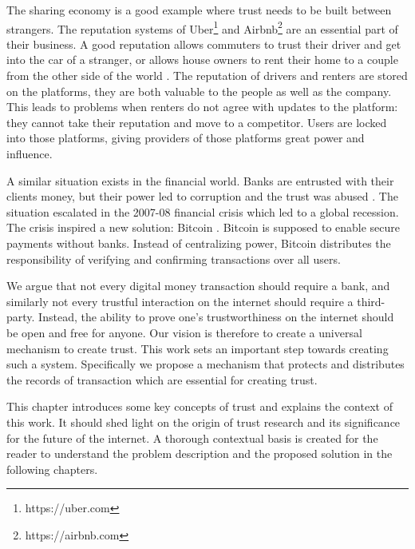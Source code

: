 The sharing economy is a good example where trust needs to be built between strangers.
The reputation systems of Uber\footnote{https://uber.com} and Airbnb\footnote{https://airbnb.com} are
an essential part of their business. A good reputation allows commuters to trust their driver and
get into the car of a stranger, or allows house owners to rent their home to a couple from the other
side of the world \cite{ert2016trust}. The reputation of drivers and renters are stored on the platforms, they are both
valuable to the people as well as the company. This leads to problems when renters do not agree with
updates to the platform: they cannot take their reputation and move to a competitor. Users are locked
into those platforms, giving providers of those platforms great power and influence.

A similar situation exists in the financial world. Banks are entrusted with their clients money, but 
their power led to corruption and the trust was abused \cite{financial_crisis}. The situation escalated in the 2007-08 
financial crisis which led to a global recession. The crisis inspired a new solution: Bitcoin \cite{nakamoto2008bitcoin}. Bitcoin
is supposed to enable secure payments without banks. Instead of centralizing power, Bitcoin distributes
the responsibility of verifying and confirming transactions over all users.

We argue that not every digital money transaction should require a bank, and similarly not every trustful
interaction on the internet should require a third-party. Instead, the ability to prove one's trustworthiness
on the internet should be open and free for anyone. Our vision is therefore to create a universal
mechanism to create trust. This work sets an important 
step towards creating such a system. Specifically we propose a mechanism that protects and 
distributes the records of transaction which are essential for creating trust. 

This chapter introduces some key concepts of trust and explains the context of this work.
It should shed light on the origin of trust research and its significance for the future of the 
internet. A thorough contextual basis is created for the reader to understand the problem description
and the proposed solution in the following chapters.

